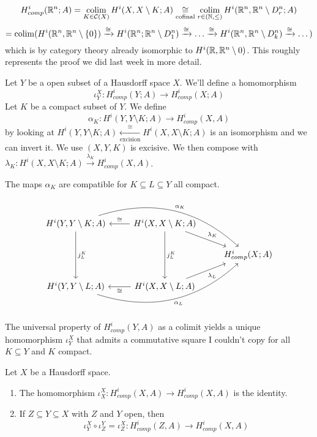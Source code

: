 \documentclass[language=english]{TemplateLecture}
\begin{document}
\begin{excursion}
\begin{example}
        \[H_{comp}^i(\mathbb{R}^n; A) = \operatorname*{\mathrm{colim}}_{K \in \mathcal{C}(X)} H^i(X, X \setminus K; A) \underset{\text{cofinal}}\cong \operatorname*{\mathrm{colim}}_{r \in (\mathbb{N}, \leq)} H^i(\mathbb{R}^n, \mathbb{R}^n \setminus D_r^n; A)\]
        \[= \operatorname*{\mathrm{colim}}(H^i(\mathbb{R}^n, \mathbb{R}^n\setminus\{0\}) \xrightarrow{\cong} H^i(\mathbb{R}^n; \mathbb{R}^n\setminus D_1^n) \xrightarrow{\cong} \dots \xrightarrow{\cong} H^i(\mathbb{R}^n, \mathbb{R}^n\setminus D_k^n) \xrightarrow{\cong} \dots)\]
        which is by category theory already isomorphic to \(H^i(\mathbb{R}, \mathbb{R}^n\setminus 0)\). This roughly represents the proof we did last week in more detail.
    \end{example}
\end{excursion}

\begin{construction}
    Let \(Y\) be a open subset of a Hausdorff space \(X\). We'll define a homomorphism
    \[\iota_Y^X\colon H_{comp}^i(Y;A) \to H_{comp}^i(X;A)\]
    Let \(K\) be a compact subset of \(Y\). We define
    \[\alpha_K\colon H^i(Y, Y\setminus K;A) \to H_{comp}^i(X,A)\]
    by looking at \(H^i(Y, Y\setminus K; A) \xleftarrow[\text{excision}]{\cong} H^i(X, X\setminus K; A)\) is an isomorphism and we can invert it. We use \((X,Y,K)\) is excisive. We then compose with \(\lambda_K \colon H^i(X, X\setminus K; A) \xrightarrow{\lambda_K} H^i_{comp}(X,A)\).

    The maps \(\alpha_K\) are compatible for \(K \subseteq L \subseteq Y\) all compact.

    \[\begin{tikzcd}
    H^i(Y,Y \setminus K; A) \ar[dd, "j_L^K"] \ar[rrd, bend left, "\alpha_K"] & 
    H^i(X, X \setminus K; A) \ar[l, "\cong"'] \ar[dd, "j_L^K"] \ar[rd, "\lambda_K"] & 
    \\
    & & H_{comp}^i(X;A) \\
    H^i(Y, Y \setminus L; A) \ar[rru, bend right, "\alpha_L"'] & 
    H^i(X, X \setminus L; A) \ar[l, "\cong"] \ar[ru, "\lambda_L"'] & 
    \end{tikzcd}\]

    The universal property of \(H^i_{comp}(Y,A)\) as a colimit yields a unique homomorphism \(\iota_Y^X\) that admits a commutative square I couldn't copy for all \(K \subseteq Y\) and \(K\) compact.
\end{construction}

\begin{proposition}
    Let \(X\) be a Hausdorff space.
    \begin{enumerate}
        \item The homomorphism \(\iota_X^X\colon H_{comp}^i(X,A) \to H_{comp}^i(X,A)\) is the identity.
        \item If \(Z \subseteq Y \subseteq X\) with \(Z\) and \(Y\) open, then
        \[\iota_Y^X \circ \iota_Z^Y = \iota_Z^X \colon H_{comp}^i(Z,A) \to H_{comp}^i(X,A)\]
    \end{enumerate}
\end{proposition}
\end{document}
